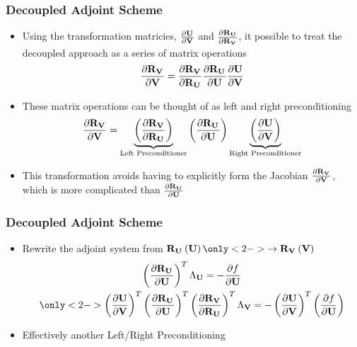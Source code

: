 \documentclass{beamer}
\begin{document}
\begin{frame}
  \frametitle{Decoupled Adjoint Scheme}
  \begin{itemize}
    \item<1-> Using the transformation matricies, $\frac{\partial \mathbf U}{\partial \mathbf V}$ and
      $\frac{\partial \mathbf R_{{\mathbf U}_{}}}{\partial \mathbf R_{{\mathbf V}_{}}}$, it possible to treat the decoupled approach as a
      series of matrix operations
      \begin{equation*}
        \frac{\partial \mathbf R_{{\mathbf V}_{}}}{\partial \mathbf V} = \frac{\partial \mathbf R_{{\mathbf V}_{}}}{\partial \mathbf R_{{\mathbf U}_{}}} \frac{\partial \mathbf R_{{\mathbf U}_{}}}{\partial \mathbf U} \frac{\partial \mathbf U}{\partial \mathbf V}
      \end{equation*}
    \item<2-> These matrix operations can be thought of as left and right
      preconditioning
      \begin{equation*}
        \frac{\partial \mathbf R_{{\mathbf V}_{}}}{\partial \mathbf V} = 
        \underbrace{ \left(\frac{\partial \mathbf R_{{\mathbf V}_{}}}{\partial \mathbf R_{{\mathbf U}_{}}}\right) }_{\text{Left Preconditioner}}
        \left(\frac{\partial \mathbf R_{{\mathbf U}_{}}}{\partial \mathbf U}\right)
        \underbrace{ \left(\frac{\partial \mathbf U}{\partial \mathbf V}\right) }_{\text{Right Preconditioner}}
      \end{equation*}
    \item<3-> This transformation avoids having to explicitly form the Jacobian
      $\frac{\partial \mathbf R_{{\mathbf V}_{}}}{\partial \mathbf V}$, which is more complicated than $\frac{\partial \mathbf R_{{\mathbf U}_{}}}{\partial \mathbf U}$
  \end{itemize}
\end{frame}
\begin{frame}
  \frametitle{Decoupled Adjoint Scheme}
  \begin{itemize}
    \item Rewrite the adjoint system from 
      $\ru{}\left( \mU \right) \only<2->{\rightarrow \rv{}\left( \mv \right)}$
      \begin{gather*}
        \left( \pd{\ru{}}{\mU} \right)^T \adjlam{\mU} = -\pd{f}{\mU} \\
        \only<2->{
          \left( \pd{\mU}{\mv} \right)^T 
          \left( \pd{\ru{}}{\mU} \right)^T 
          \left( \pd{\rv{}}{\ru{}} \right)^T 
          \adjlam{\mv} = -\left( \pd{\mU}{\mv} \right)^T
          \left(\pd{f}{\mU}\right)
        }
      \end{gather*}
    \item<3-> Effectively another Left/Right Preconditioning
  \end{itemize}
  \vspace{0.2cm}
\end{frame}
\end{document}
